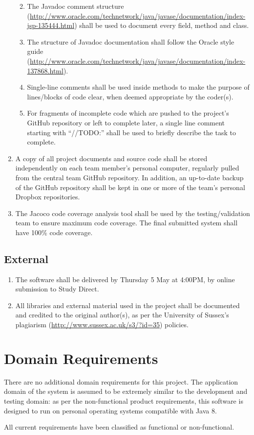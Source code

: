 \documentclass[11pt]{article}
\providecommand{\tightlist}{%
  \setlength{\itemsep}{0pt}\setlength{\parskip}{0pt}}
\begin{document}
\begin{enumerate}
  \begin{enumerate}
  \def\labelenumii{\arabic{enumii}.}
  \tightlist
  \item
    The Javadoc comment structure (\url{http://www.oracle.com/technetwork/java/javase/documentation/index-jsp-135444.html}) shall be used to document every field, method and
    class.
  \item
    The structure of Javadoc documentation shall follow the Oracle
    style guide (\url{http://www.oracle.com/technetwork/java/javase/documentation/index-137868.html}).
  \item
    Single-line comments shall be used inside methods to make the
    purpose of lines/blocks of code clear, when deemed appropriate by
    the coder(s).
  \item
    For fragments of incomplete code which are pushed to the project's
    GitHub repository or left to complete later, a single line comment
    starting with ``//TODO:'' shall be used to briefly describe the task
    to complete.
  \end{enumerate}
\item
  A copy of all project documents and source code shall be stored
  independently on each team member's personal computer, regularly
  pulled from the central team GitHub repository. In addition, an
  up-to-date backup of the GitHub repository shall be kept in one or
  more of the team's personal Dropbox repositories.
\item
  The Jacoco code coverage analysis tool shall be used by the
  testing/validation team to ensure maximum code coverage. The final
  submitted system shall have 100\% code coverage.
\end{enumerate}

\subsection{External}\label{external}

\begin{enumerate}
\def\labelenumi{\arabic{enumi}.}
\tightlist
\item
  The software shall be delivered by Thursday 5 May at 4:00PM, by online
  submission to Study Direct.
\item
  All libraries and external material used in the project shall be
  documented and credited to the original author(s), as per the
  University of Sussex's plagiarism (\url{http://www.sussex.ac.uk/s3/?id=35}) policies.
\end{enumerate}

\newpage
\section{Domain Requirements}

There are no additional domain requirements for this project. The application domain of the system is assumed to be extremely similar to the development and testing domain: as per the non-functional product requirements, this software is designed to run on personal operating systems compatible with Java 8.

All current requirements have been classified as functional or non-functional.
\end{document}
